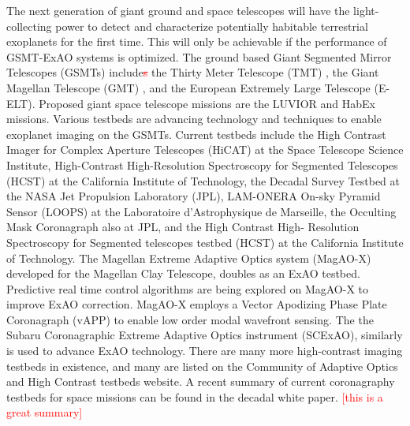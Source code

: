 \documentclass[12pt]{spieman}  %
\newcommand{\jrmrmv}[1]{\textcolor{red}{\sout{#1}}}
\newcommand{\jrmcom}[1]{\textcolor{red}{[#1]}}
\begin{document}
\begin{spacing}{2}
The next generation of giant ground and space telescopes will have the light-collecting power to detect and characterize potentially habitable terrestrial exoplanets for the first time. This will only be achievable if the performance of GSMT-ExAO systems is optimized. The ground based Giant Segmented Mirror Telescopes (GSMTs) include\jrmrmv{s} the Thirty Meter Telescope (TMT) \cite{chisholm2020thirty}, the Giant Magellan Telescope (GMT) \cite{fanson2020overview}, and the European Extremely Large Telescope (E-ELT)\cite{ramsay2020eso}. Proposed giant space telescope missions are the LUVIOR\cite{2020AAS...23544704O} and HabEx\cite{gaudi2020habitable} missions. Various testbeds are advancing technology and techniques to enable exoplanet imaging on the GSMTs. Current testbeds include the High Contrast Imager for Complex Aperture Telescopes (HiCAT)\cite{2014SPIE.9143E..27N} at the Space Telescope Science Institute,  High-Contrast High-Resolution Spectroscopy for Segmented Telescopes (HCST)\cite{jovanovic2018high} at the California Institute of Technology, the Decadal Survey Testbed\cite{belikov2014ames} at the NASA Jet Propulsion Laboratory (JPL), LAM-ONERA On-sky Pyramid Sensor (LOOPS)\cite{janin2019adaptive} at the Laboratoire d'Astrophysique de Marseille, the Occulting Mask Coronagraph\cite{shi2017dynamic} also at JPL, and the High Contrast High- Resolution Spectroscopy for Segmented telescopes testbed (HCST)\cite{jovanovic2018high} at the California Institute of Technology. The Magellan Extreme Adaptive Optics system (MagAO-X)\cite{males2020magao} developed for the Magellan Clay Telescope, doubles as an ExAO testbed. Predictive real time control algorithms are being explored on MagAO-X to improve ExAO correction.\cite{haffert2021data} MagAO-X employs a Vector Apodizing Phase Plate Coronagraph (vAPP)\cite{snik2012vector} to enable low order modal wavefront sensing.\cite{2019JATIS...5d9004M} The the Subaru Coronagraphic Extreme Adaptive Optics instrument (SCExAO)\cite{jovanovic2015subaru}, similarly is used to advance ExAO technology. There are many more high-contrast imaging testbeds in existence, and many are listed on the Community of Adaptive Optics and High Contrast testbeds website\cite{CHAOTIC}. A recent summary of current coronagraphy testbeds for space missions can be found in the decadal white paper.\cite{mazoyer2019high} \jrmcom{this is a great summary}


\end{spacing}
\end{document}
